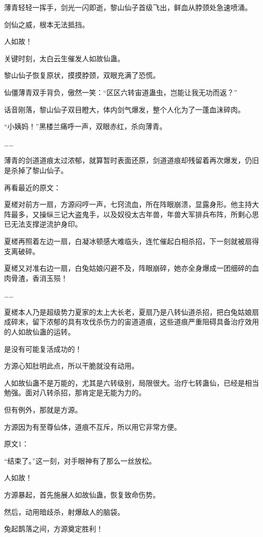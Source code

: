 \begin{this_body}
薄青轻轻一挥手，剑光一闪即逝，黎山仙子首级飞出，鲜血从脖颈处急速喷涌。

剑仙之威，根本无法抵挡。

人如故！

关键时刻，太白云生催发人如故仙蛊。

黎山仙子恢复原状，摸摸脖颈，双眼充满了恐慌。

仙僵薄青双手背负，傲然一笑：“区区六转宙道蛊虫，岂能让我无功而返？”

话音刚落，黎山仙子双目瞪大，体内剑气爆发，整个人化为了一蓬血沫碎肉。

“小姨妈！”黑楼兰痛呼一声，双眼赤红，杀向薄青。

……

薄青的剑道道痕太过浓郁，就算暂时表面还原，剑道道痕却残留着再次爆发，仍旧是杀掉了黎山仙子。

再看最近的原文：

夏槎对前方一扇，方源闷哼一声，七窍流血，所在阵眼崩溃，显露身形。他主持大阵最多，又操纵三记大盗鬼手，以及奴役太古年兽，年兽大军排兵布阵，所剩心思已无法支撑逆流护身印。

夏槎再照着左边一扇，白凝冰顿感大难临头，连忙催起白相杀招，下一刻就被扇得支离破碎。

夏槎又对准右边一扇，白兔姑娘闪避不及，阵眼崩碎，她亦全身爆成一团细碎的血肉骨渣，香消玉殒！

……

夏槎本人乃是超级势力夏家的太上大长老，夏扇乃是八转仙道杀招，把白兔姑娘扇成碎末，留下浓郁的具有攻伐杀伤力的宙道道痕，这些道痕严重阻碍具备治疗效用的人如故仙蛊的运转。

是没有可能复活成功的！

方源心知肚明此点，所以干脆就没有动用。

人如故仙蛊不是万能的，尤其是六转级别，局限很大。治疗七转蛊仙，已经是相当勉强。面对八转杀招，那肯定是无能为力的。

但有例外，那就是方源。

方源因为有至尊仙体，道痕不互斥，所以用它非常方便。

原文1：

“结束了。”这一刻，对手眼神有了那么一丝放松。

人如故！

方源暴起，首先施展人如故仙蛊，恢复致命伤势。

然后，动用暗歧杀，射爆敌人的脑袋。

兔起鹊落之间，方源奠定胜利！


\end{this_body}
